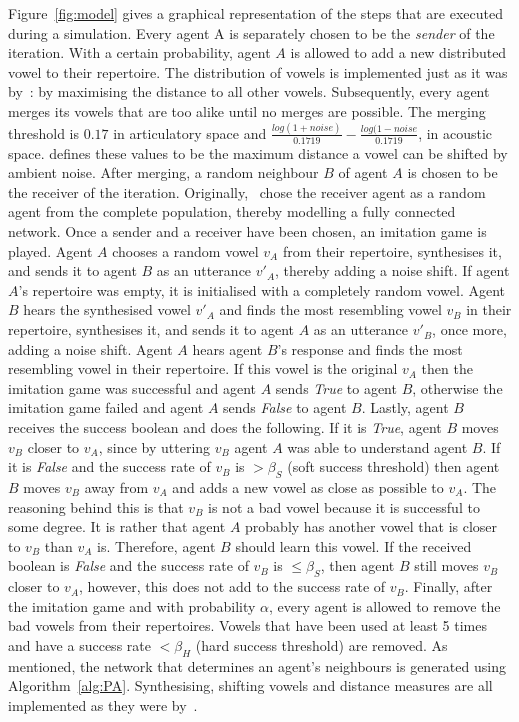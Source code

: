 \documentclass[11pt]{article}
\begin{document}
Figure~\ref{fig:model} gives a graphical representation of the steps that are executed during a simulation. Every agent A is separately chosen
to be the \textit{sender} of the iteration. With a certain probability, agent $A$ is allowed to add a new distributed vowel to their repertoire.
The distribution of vowels is implemented just as it was by~: by
maximising the distance to all other vowels. Subsequently, every agent merges its vowels that are too alike until no merges
are possible. The merging threshold is $0.17$ in articulatory space and $\frac{log(1+noise)}{0.1719} - \frac{log(1-noise}{0.1719}$, in acoustic space.
 defines these values to be the maximum distance a vowel can be shifted by ambient noise.
After merging, a random neighbour $B$ of agent $A$ is chosen to be the receiver of the iteration.
Originally,~ chose the receiver agent as a random agent from the
complete population, thereby modelling a fully connected network. Once a sender and a receiver have been chosen, an
imitation game is played. Agent $A$ chooses a random vowel $v_A$ from their repertoire, synthesises it, and sends it to
agent $B$ as an utterance $v'_A$, thereby adding a noise shift. If agent $A$'s repertoire was empty, it is
initialised with a completely random vowel. Agent $B$ hears the synthesised vowel $v'_A$ and finds the most resembling
vowel $v_B$ in their repertoire, synthesises it, and sends it to agent $A$ as an utterance $v'_B$, once more, adding a
noise shift. Agent $A$ hears agent $B$'s response and finds the most resembling vowel in their repertoire. If
this vowel is the original $v_A$ then the imitation game was successful and agent $A$ sends \textit{True} to agent $B$,
otherwise the imitation game failed and agent $A$ sends \textit{False} to agent $B$. Lastly, agent $B$ receives the
success boolean and does the following. If it is \textit{True}, agent $B$ moves $v_B$ closer to $v_A$, since by
uttering $v_B$ agent $A$ was able to understand agent $B$. If it is \textit{False} and the success rate of $v_B$ is $>\beta_S$ (soft success threshold)
then agent $B$ moves $v_B$ away from $v_A$ and adds a new vowel as close as possible to $v_A$. The reasoning
behind this is that $v_B$ is not a bad vowel because it is successful to some degree. It is rather that
agent $A$ probably has another vowel that is closer to $v_B$ than $v_A$ is. Therefore, agent $B$ should learn this
vowel. If the received boolean is \textit{False} and the success rate of $v_B$ is $\leq \beta_S$, then agent $B$ still
moves $v_B$ closer to $v_A$, however, this does not add to the success rate of $v_B$. Finally, after the imitation game
and with probability $\alpha$, every agent is allowed to remove the bad vowels from their repertoires.
Vowels that have been used at least 5 times and have a success rate $< \beta_H$ (hard success threshold) are removed. As mentioned, the network
that determines an agent's neighbours is generated using Algorithm~\ref{alg:PA}. Synthesising, shifting vowels and
distance measures are all implemented as they were by~.
\end{document}
